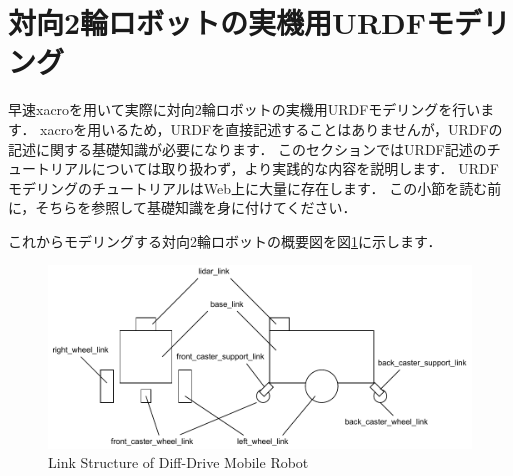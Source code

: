\documentclass[{../../master}]{subfiles}
\begin{document}
\section{対向2輪ロボットの実機用URDFモデリング}

早速\textsf{xacro}を用いて実際に対向2輪ロボットの実機用URDFモデリングを行います．
\textsf{xacro}を用いるため，URDFを直接記述することはありませんが，URDFの記述に関する基礎知識が必要になります．
このセクションではURDF記述のチュートリアルについては取り扱わず，より実践的な内容を説明します．
URDFモデリングのチュートリアルはWeb上に大量に存在します．
この小節を読む前に，そちらを参照して基礎知識を身に付けてください．

これからモデリングする対向2輪ロボットの概要図を図\ref{fig:mobile_robot_structure}に示します．

\begin{figure}[ht]
  \centering
  \includegraphics[width=100truemm, clip]{images/mobile_robot_structure.pdf}
  \caption{Link Structure of Diff-Drive Mobile Robot}
  \label{fig:mobile_robot_structure}
\end{figure}
\end{document}
